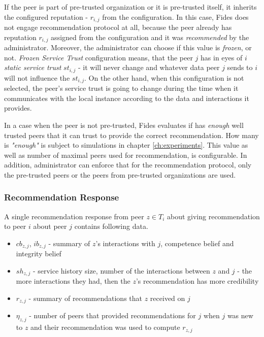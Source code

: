 If the peer is part of pre-trusted organization or it is pre-trusted itself, it inherits the configured reputation - $r_{i, j}$ from the configuration.
In this case, Fides does not engage recommendation protocol at all, because the peer already has reputation $r_{i,j}$ assigned from the configuration and it was \textit{recommended} by the administrator.
Moreover, the administrator can choose if this value is \textit{frozen}, or not. 
\textit{Frozen Service Trust} configuration means, that the peer $j$ has in eyes of $i$ \textit{static service trust} $st_{i, j}$ - it will never change and whatever data peer $j$ sends to $i$ will not influence the $st_{i,j}$.
On the other hand, when this configuration is not selected, the peer's service trust is going to change during the time when it communicates with the local instance according to the data and interactions it provides.

In a case when the peer is not pre-trusted, Fides evaluates if has \textit{enough} well trusted peers that it can trust to provide the correct recommendation. How many is \textit{"enough"} is subject to simulations in chapter \ref{ch:experiments}. This value as well as number of maximal peers used for recommendation, is configurable.
In addition, administrator can enforce that for the recommendation protocol, only the pre-trusted peers or the peers from pre-trusted organizations are used.

\subsubsection{Recommendation Response}
A single recommendation response from peer $z \in T_{i}$ about giving recommendation to peer $i$ about peer $j$ contains following data.
\begin{itemize}
    \item $cb_{z,j}$, $ib_{z,j}$ - summary of $z$'s interactions with $j$, competence belief and integrity belief
    \item $sh_{z,j}$ - service history size, number of the interactions between $z$ and $j$ - the more interactions they had, then the $z$'s recommendation has more credibility
    \item $r_{z, j}$ - summary of recommendations that $z$ received on $j$
    \item $\eta_{z,j}$ - number of peers that provided recommendations for $j$ when $j$ was new to $z$ and their recommendation was used to compute $r_{z,j}$
\end{itemize}

